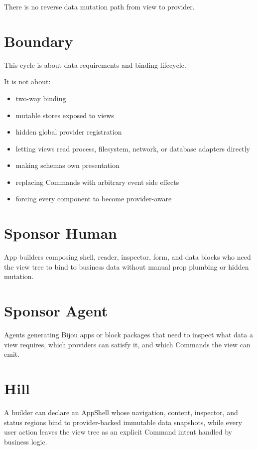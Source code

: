 

There is no reverse data mutation path from view to provider.

\section{Boundary}\label{record-132-boundary}

This cycle is about data requirements and binding lifecycle.

It is not about:

\begin{itemize}
\tightlist
\item
  two-way binding
\item
  mutable stores exposed to views
\item
  hidden global provider registration
\item
  letting views read process, filesystem, network, or database adapters directly
\item
  making schemas own presentation
\item
  replacing Commands with arbitrary event side effects
\item
  forcing every component to become provider-aware
\end{itemize}

\section{Sponsor Human}\label{record-132-sponsor-human}

App builders composing shell, reader, inspector, form, and data blocks who need the view tree to bind to business data without manual prop plumbing or hidden mutation.

\section{Sponsor Agent}\label{record-132-sponsor-agent}

Agents generating Bijou apps or block packages that need to inspect what data a view requires, which providers can satisfy it, and which Commands the view can emit.

\section{Hill}\label{record-132-hill}

A builder can declare an AppShell whose navigation, content, inspector, and status regions bind to provider-backed immutable data snapshots, while every user action leaves the view tree as an explicit Command intent handled by business logic.

